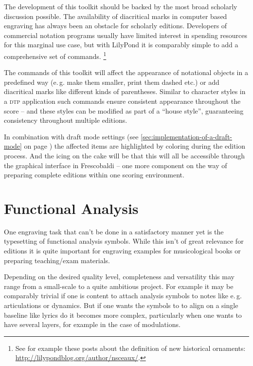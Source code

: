 \documentclass[oneside]{OLLbook}
\begin{document}
The development of this toolkit should be backed by the most broad scholarly discussion possible.
The availability of diacritical marks in computer based engraving has always been an obstacle for scholarly editions.
Developers of commercial notation programs usually have limited interest in spending resources for this marginal use case, but with LilyPond it is comparably simple to add a comprehensive set of commands.%
\footnote{See for example these posts about the definition of new historical ornaments:\\
\url{http://lilypondblog.org/author/nsceaux/}.}

The commands of this toolkit will affect the appearance of notational objects in a predefined way (e.\,g. make them smaller, print them dashed etc.) or add diacritical marks like different kinds of parentheses.
Similar to character styles in a \textsc{dtp} application such commands ensure consistent appearance throughout the score -- and these styles can be modified as part of a “house style”, guaranteeing consistency throughout multiple editions.

In combination with draft mode settings (see \ref{sec:implementation-of-a-draft-mode} on page \pageref{sec:implementation-of-a-draft-mode}) the affected items are highlighted by coloring during the edition process.
And the icing on the cake will be that this will all be accessible through the graphical interface in Frescobaldi -- one more component on the way of preparing complete editions within one scoring environment.


\section{Functional Analysis}\label{sec:lilypond-riemann}

One engraving task that can't be done in a satisfactory manner yet is the typesetting of functional analysis symbols.
While this isn't of great relevance for editions it is quite important for engraving examples for musicological books or preparing teaching/exam materials.

Depending on the desired quality level, completeness and versatility this may range from a small-scale to a quite ambitious project.
For example it may be comparably trivial if one is content to attach analysis symbols to notes like e.\,g. articulations or dynamics.
But if one wants the symbols to to align on a single baseline like lyrics do it becomes more complex, particularly when one wants to have several layers, for example in the case of modulations.
\end{document}
